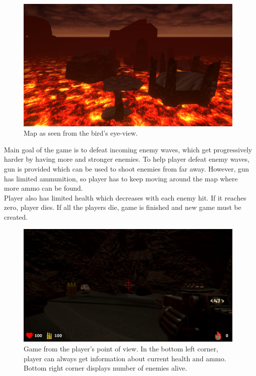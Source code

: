 \documentclass[times, utf8, diplomski]{fer}
\begin{document}
\begin{figure}[H]
	\centering
	\includegraphics[scale=0.56]{Game-map}
	\caption{Map as seen from the bird's eye-view.}
\end{figure}

Main goal of the game is to defeat incoming enemy waves, which get progressively harder by having more and stronger enemies. To help player defeat enemy waves, gun is provided which can be used to shoot enemies from far away. However, gun has limited ammunition, so player has to keep moving around the map where more ammo can be found. \\

Player also has limited health which decreases with each enemy hit. If it reaches zero, player dies. If all the players die, game is finished and new game must be created.

\begin{figure}[H]
	\centering
	\includegraphics[scale=0.5]{Game-spawn}
	\caption{Game from the player's point of view. In the bottom left corner, player can always get information about current health and ammo. Bottom right corner displays number of enemies alive.}
\end{figure}
\end{document}
